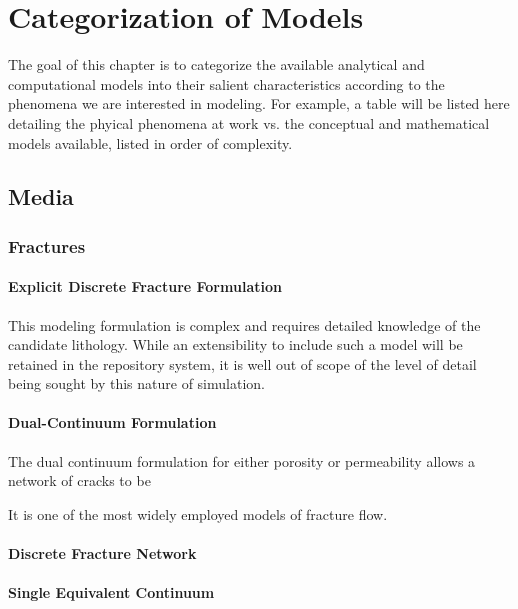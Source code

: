 \chapter{Categorization of Models}\label{ch:categorization}

The goal of this chapter is to categorize the available analytical and 
computational models into their salient characteristics according to the 
phenomena we are interested in modeling. For example, a table will be listed 
here detailing the phyical phenomena at work vs. the conceptual and 
mathematical models available, listed in order of complexity.


\section{Media}

\subsection{Fractures}

\subsubsection{Explicit Discrete Fracture Formulation}

This modeling formulation is complex and requires detailed knowledge of the 
candidate lithology. While an extensibility to include such a model will be 
retained in the repository system, it is well out of scope of the level of 
detail being sought by this nature of simulation. 

\subsubsection{Dual-Continuum Formulation}

The dual continuum formulation for either porosity or permeability allows a 
network of cracks to be 

It is one of the most widely employed models of fracture flow. 
\cite{diodato_compendium_1994}

\subsubsection{Discrete Fracture Network}
\subsubsection{Single Equivalent Continuum}
